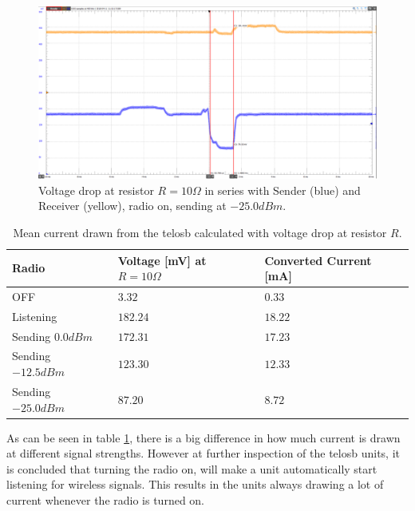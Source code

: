 \begin{figure}[H]
	\centering
	\includegraphics[width=1\linewidth]{implementation/energylab/fig/radioOn_sendLowSignal.png}
	\caption{Voltage drop at resistor $R=10\Omega$ in series with Sender (blue) and Receiver (yellow), radio on, sending at $-25.0dBm$.}
	\label{fig:radioOn_sendLowSignal}
\end{figure}

\begin{table}[H]
	\centering
	\begin{tabularx}{\linewidth}{|X|X|X|}
		\hline
		Radio				& Voltage [mV] at $R=10\Omega$	& Converted Current [mA]	\\ \hline
		OFF					& $3.32$						& $0.33$					\\ \hline
		Listening			& $182.24$						& $18.22$					\\ \hline
		Sending $0.0dBm$	& $172.31$						& $17.23$					\\ \hline
		Sending $-12.5dBm$	& $123.30$						& $12.33$					\\ \hline
		Sending $-25.0dBm$	& $87.20$						& $8.72$					\\ \hline
	\end{tabularx}
	\caption{Mean current drawn from the telosb calculated with voltage drop at resistor $R$.}
	\label{tab:signalStrengthEnergyConsumption}
\end{table}

\noindent As can be seen in table \ref{tab:signalStrengthEnergyConsumption}, there is a big difference in how much current is drawn at different signal strengths. However at further inspection of the telosb units, it is concluded that turning the radio on, will make a unit automatically start listening for wireless signals. This results in the units always drawing a lot of current whenever the radio is turned on.

